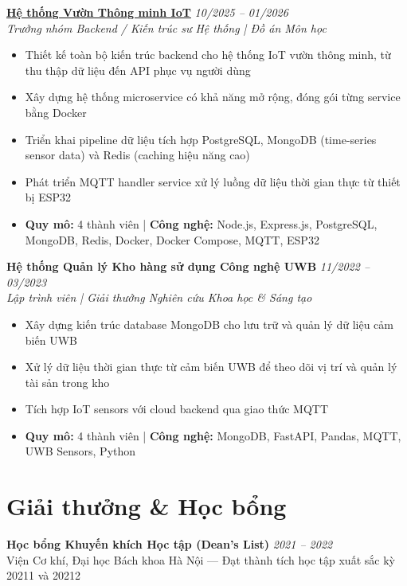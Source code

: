\documentclass[11pt,a4paper]{article}
\newcommand{\cventry}[4]{
  \noindent\textbf{#1} \hfill \textit{#2} \\
  \textit{#3} \\
  #4
  \vspace{0.4em}
}
\begin{document}
\cventry
  {\href{https://github.com/AndrewHaward2310/IoTSmartGardenSystem}{Hệ thống Vườn Thông minh IoT}}
  {10/2025 -- 01/2026}
  {Trưởng nhóm Backend / Kiến trúc sư Hệ thống | Đồ án Môn học}
  {
    \begin{itemize}[leftmargin=1.5em, topsep=0pt, itemsep=0.15em]
      \item Thiết kế toàn bộ kiến trúc backend cho hệ thống IoT vườn thông minh, từ thu thập dữ liệu đến API phục vụ người dùng
      \item Xây dựng hệ thống microservice có khả năng mở rộng, đóng gói từng service bằng Docker
      \item Triển khai pipeline dữ liệu tích hợp PostgreSQL, MongoDB (time-series sensor data) và Redis (caching hiệu năng cao)
      \item Phát triển MQTT handler service xử lý luồng dữ liệu thời gian thực từ thiết bị ESP32
      \item \textbf{Quy mô:} 4 thành viên \quad | \quad \textbf{Công nghệ:} Node.js, Express.js, PostgreSQL, MongoDB, Redis, Docker, Docker Compose, MQTT, ESP32
    \end{itemize}
  }

\cventry
  {Hệ thống Quản lý Kho hàng sử dụng Công nghệ UWB}
  {11/2022 -- 03/2023}
  {Lập trình viên | Giải thưởng Nghiên cứu Khoa học \& Sáng tạo}
  {
    \begin{itemize}[leftmargin=1.5em, topsep=0pt, itemsep=0.15em]
      \item Xây dựng kiến trúc database MongoDB cho lưu trữ và quản lý dữ liệu cảm biến UWB
      \item Xử lý dữ liệu thời gian thực từ cảm biến UWB để theo dõi vị trí và quản lý tài sản trong kho
      \item Tích hợp IoT sensors với cloud backend qua giao thức MQTT
      \item \textbf{Quy mô:} 4 thành viên \quad | \quad \textbf{Công nghệ:} MongoDB, FastAPI, Pandas, MQTT, UWB Sensors, Python
    \end{itemize}
  }

\section{Giải thưởng \& Học bổng}

\noindent\textbf{Học bổng Khuyến khích Học tập (Dean's List)} \hfill \textit{2021 -- 2022} \\
Viện Cơ khí, Đại học Bách khoa Hà Nội — Đạt thành tích học tập xuất sắc kỳ 20211 và 20212
\end{document}
